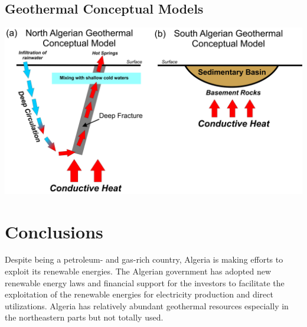 \documentclass[a0,portrait]{a0poster}
\begin{document}
\begin{multicols}{3}
\subsection*{Geothermal Conceptual Models}
\begin{center}\vspace{1cm}
\includegraphics[width=1.0\linewidth]{Algerian_geothermal_models.jpg}
\end{center}


\color{SaddleBrown} %

\section*{Conclusions}
Despite being a petroleum- and gas-rich country, Algeria is making efforts to exploit its renewable energies. The Algerian government has adopted new renewable energy laws and financial support for the investors to facilitate the exploitation of the renewable energies for electricity production and direct utilizations. Algeria has relatively abundant geothermal resources especially in the northeastern parts but not totally used.
\color{Black} %



\end{multicols}
\end{document}
